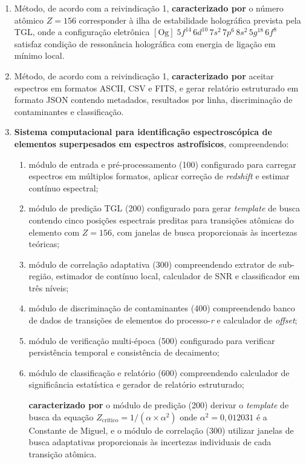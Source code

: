 \documentclass[12pt,a4paper]{article}
\newcommand{\alphaii}{\alpha^2}
\newcommand{\Zcrit}{Z_{\text{cr\'{i}tico}}}
\begin{document}
\begin{enumerate}
\item Método, de acordo com a reivindicação 1, \textbf{caracterizado
por} o número atômico $Z = 156$ corresponder à ilha de estabilidade
holográfica prevista pela TGL, onde a configuração eletrônica
$[\text{Og}]\; 5f^{14}\, 6d^{10}\, 7s^2\, 7p^6\, 8s^2\, 5g^{18}\,
6f^8$ satisfaz condição de ressonância holográfica com energia
de ligação em mínimo local.

\item Método, de acordo com a reivindicação 1, \textbf{caracterizado
por} aceitar espectros em formatos ASCII, CSV e FITS, e gerar
relatório estruturado em formato JSON contendo metadados, resultados
por linha, discriminação de contaminantes e classificação.


\item \textbf{Sistema computacional para identificação
espectroscópica de elementos superpesados em espectros
astrofísicos}, compreendendo:
  \begin{enumerate}[label=(\alph*)]
  \item módulo de entrada e pré-processamento (100) configurado
  para carregar espectros em múltiplos formatos, aplicar correção
  de \textit{redshift} e estimar contínuo espectral;
  \item módulo de predição TGL (200) configurado para gerar
  \textit{template} de busca contendo cinco posições espectrais
  preditas para transições atômicas do elemento com $Z = 156$,
  com janelas de busca proporcionais às incertezas teóricas;
  \item módulo de correlação adaptativa (300) compreendendo
  extrator de sub-região, estimador de contínuo local, calculador
  de SNR e classificador em três níveis;
  \item módulo de discriminação de contaminantes (400)
  compreendendo banco de dados de transições de elementos do
  processo-\textit{r} e calculador de \textit{offset};
  \item módulo de verificação multi-época (500) configurado para
  verificar persistência temporal e consistência de decaimento;
  \item módulo de classificação e relatório (600) compreendendo
  calculador de significância estatística e gerador de relatório
  estruturado;

  \textbf{caracterizado por} o módulo de predição (200)
  derivar o \textit{template} de busca da equação
  $\Zcrit = 1/(\alpha \times \alphaii)$ onde $\alphaii = 0{,}012031$
  é a Constante de Miguel, e o módulo de correlação (300) utilizar
  janelas de busca adaptativas proporcionais às incertezas
  individuais de cada transição atômica.
  \end{enumerate}


\end{enumerate}
\end{document}
